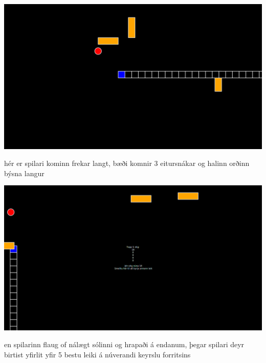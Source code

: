 \documentclass{article}
\begin{document}
\begin{center}
    \includegraphics[scale=0.175]{sImg3.png}
\end{center}
hér er spilari kominn frekar langt, bæði komnir 3 eitursnákar og halinn orðinn býsna langur

\begin{center}
    \includegraphics[scale=0.175]{sImg5.png}
\end{center}
en spilarinn flaug of nálægt sólinni og hrapaði á endanum, 
þegar spilari deyr birtist yfirlit yfir 5 bestu leiki á núverandi keyrslu forritsins
\end{document}
